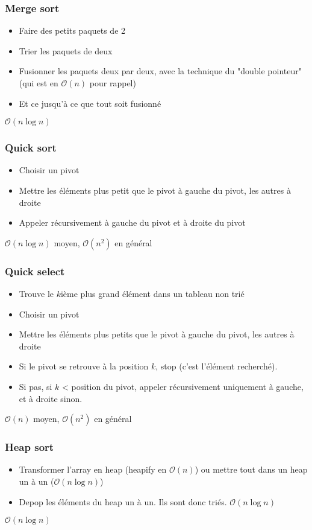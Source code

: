 \documentclass[8pt,aspectratio=169]{beamer}
\begin{document}
\begin{frame}
\frametitle{Merge sort}
\begin{itemize}
	\item Faire des petits paquets de 2
	\item Trier les paquets de deux
	\item Fusionner les paquets deux par deux, avec la technique du "double pointeur" (qui est en $\mathcal{O}(n)$ pour rappel)
	\item Et ce jusqu'à ce que tout soit fusionné
\end{itemize}
$\mathcal{O}(n\log n)$
\end{frame}

\begin{frame}
\frametitle{Quick sort}
\begin{itemize}
	\item Choisir un pivot
	\item Mettre les éléments plus petit que le pivot à gauche du pivot, les autres à droite
	\item Appeler récursivement à gauche du pivot et à droite du pivot
\end{itemize}
$\mathcal{O}(n\log n)$ moyen, $\mathcal{O}(n^2)$ en général
\end{frame}

\begin{frame}
\frametitle{Quick select}
\begin{itemize}
	\item Trouve le $k$ième plus grand élément dans un tableau non trié
	\item Choisir un pivot
	\item Mettre les éléments plus petits que le pivot à gauche du pivot, les autres à droite
	\item Si le pivot se retrouve à la position $k$, stop (c'est l'élément recherché).
	\item Si pas, si $k$ < position du pivot, appeler récursivement uniquement à gauche, et à droite sinon.
\end{itemize}
$\mathcal{O}(n)$ moyen, $\mathcal{O}(n^2)$ en général
\end{frame}

\begin{frame}
\frametitle{Heap sort}
\begin{itemize}
	\item Transformer l'array en heap (heapify en $\mathcal{O}(n)$) ou mettre tout dans un heap un à un ($\mathcal{O}(n\log n)$)
	\item Depop les éléments du heap un à un. Ils sont donc triés. $\mathcal{O}(n\log n)$
\end{itemize}
$\mathcal{O}(n\log n)$
\end{frame}
\end{document}
